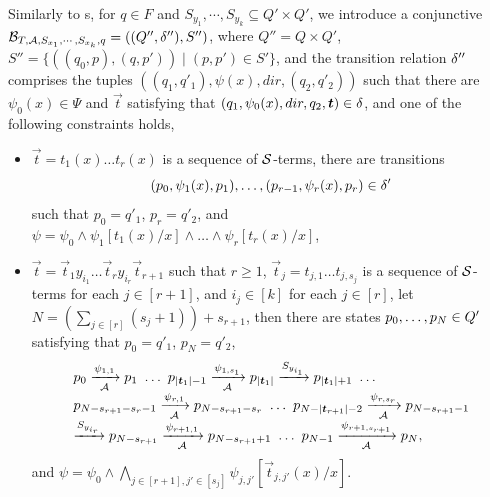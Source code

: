 Similarly to \FFA{}s, for $q \in F$ and  $S_{y_1}, \cdots, S_{y_k} \subseteq Q' \times Q'$, we  introduce a conjunctive \SSA{} $\mathcal{B}_{T, \mathcal{A}, S_{x_1}, \cdots, S_{x_k}, q} = ((Q'', \delta''), S'')$, where $Q'' = Q \times Q'$, $S'' = \{((q_0, p), (q, p')) \mid (p, p') \in S'\}$, and the transition relation $\delta''$ comprises the tuples 
$((q_1, q'_1), \psi(x), dir, (q_2, q'_2))$ such that there are $\psi_0(x) \in \Psi$ and $\vec{t}$ satisfying that $(q_1, \psi_0(x), dir, q_2, \vec{t}) \in \transrel$, and one of the following constraints holds, 
\begin{itemize}
\item $\vec{t} = t_1(x) \ldots t_r(x)$ is a sequence of $\mathcal{S}$-terms, there are transitions 
$$(p_{0}, \psi_1(x), p_{1}), \ldots, (p_{r-1}, \psi_r(x), p_r) \in \delta'$$ 
such that $p_0 = q'_1$, $p_r = q'_2$, and $\psi = \psi_0 \wedge \psi_1[t_1(x)/x] \wedge \ldots \wedge \psi_r[t_r(x)/x]$,
%
\item $\vec{t} = \vec{t}_1 y_{i_1} \ldots \vec{t}_{r} y_{i_{r}} \vec{t}_{r+1}$ such that $r \ge 1$, $\vec{t}_j = t_{j, 1} \ldots t_{j, s_j}$ is a sequence of $\mathcal{S}$-terms for each $j \in [r+1]$,  and $i_j \in [k]$ for each $j \in [r]$, let $N = (\sum \limits_{j \in [r]} (s_j+ 1)) +s_{r+1}$, then there are states $p_0, \ldots, p_{N} \in Q'$ satisfying that $p_0 = q'_1$, $p_{N} = q'_2$,  
%
$$
\begin{array}{l}
p_0 \xrightarrow[\Aut]{\psi_{1,1}} p_1\ \ldots\ p_{|\vec{t}_1|-1} \xrightarrow[\Aut]{\psi_{1, s_1}} p_{|\vec{t}_1|} \xrightarrow{S_{y_{i_1}}} p_{|\vec{t}_1|+1}\ \ldots\\
p_{N - s_{r+1} - s_r -1} \xrightarrow[\Aut]{\psi_{r, 1}} p_{N - s_{r+1} - s_r } \ \ldots\ p_{N - |\vec{t}_{r+1}| - 2} \xrightarrow[\Aut]{\psi_{r, s_r}} p_{N-s_{r+1}-1}\\
 \xrightarrow{S_{y_{i_r}}} p_{N- s_{r+1}} \xrightarrow[\Aut]{\psi_{r+1, 1}} p_{N -s_{r+1}+1}\ \ldots\ p_{N - 1} \xrightarrow[\Aut]{\psi_{r+1,  s_{r+1}} } p_{N},
\end{array}
 $$ 
 and $\psi = \psi_0 \wedge \bigwedge \limits_{j \in [r+1], j' \in [s_j]} \psi_{j, j'} [\vec{t}_{j, j'}(x)/x].$
\end{itemize}
%
%
